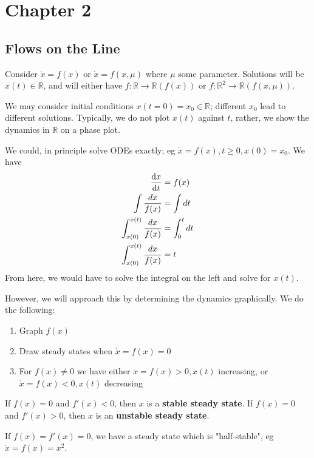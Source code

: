 \documentclass[12pt, oneside]{article}
\begin{document}
\newpage

\section{Chapter 2}

\subsection{Flows on the Line}

Consider $\dot{x} = f(x)$ or $\dot{x} = f(x, \mu)$ where $\mu$ some parameter. Solutions will be $x(t) \in \mathbb{R}$, and will either have $f: \mathbb{R} \to \mathbb{R} (f(x))$ or $f: \mathbb{R}^2 \to \mathbb{R} (f(x,\mu))$.

We may consider initial conditions $x(t=0) = x_0 \in \mathbb{R}$; different $x_0$ lead to different solutions. Typically, we do not plot $x(t)$ against $t$, rather, we show the dynamics in $\mathbb{R}$ on a phase plot.

We could, in principle solve ODEs exactly; eg $\dot{x} =f(x), t \geq 0, x(0) = x_0$. We have \begin{align*}
  \dv{x}{t} &= f(x)\\
  \int \frac{dx}{f(x)} &= \int dt\\
  \int_{x(0)}^{x(t)} \frac{dx}{f(x)} &= \int_0^t dt\\
  \int_{x(0)}^{x(t)} \frac{dx}{f(x)} &= t
\end{align*}
From here, we would have to solve the integral on the left and solve for $x(t)$.

However, we will approach this by determining the dynamics graphically. We do the following:

\begin{enumerate}
  \item Graph $f(x)$
  \item Draw steady states when $\dot{x} = f(x) = 0$
  \item For $f(x) \neq 0$ we have either $\dot{x} = f(x) > 0, x(t)$ increasing, or $\dot{x} = f(x) < 0, x(t)$ decreasing
\end{enumerate}

\begin{remark}
  If $f(x) = 0$ and $f'(x) < 0$, then $x$ is a \textbf{stable steady state}. If $f(x) = 0$ and $f'(x) > 0$, then $x$ is an \textbf{unstable steady state}.

  If $f(x) = f'(x) = 0$, we have a steady state which is "half-stable", eg $\dot{x} = f(x) = x^2$.
\end{remark}
\end{document}
